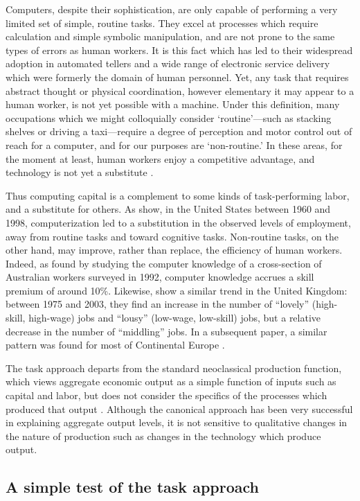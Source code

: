 \documentclass[a4paper,11pt,notitlepage]{article}
\begin{document}
Computers, despite their sophistication, are only capable of performing a very limited set of simple, routine tasks. They excel at processes which require calculation and simple symbolic manipulation, and are not prone to the same types of errors as human workers. It is this fact which has led to their widespread adoption in automated tellers and a wide range of electronic service delivery which were formerly the domain of human personnel. Yet, any task that requires abstract thought or physical coordination, however elementary it may appear to a human worker, is not yet possible with a machine. Under this definition, many occupations which we might colloquially consider `routine'---such as stacking shelves or driving a taxi---require a degree of perception and motor control out of reach for a computer, and for our purposes are `non-routine.' In these areas, for the moment at least, human workers enjoy a competitive advantage, and technology is not yet a substitute \citep{Levy2003}.

Thus computing capital is a complement to some kinds of task-performing labor, and a substitute for others. As \citet{Levy2003} show, in the United States between 1960 and 1998, computerization led to a substitution in the observed levels of employment, away from routine tasks and toward cognitive tasks. Non-routine tasks, on the other hand, may improve, rather than replace, the efficiency of human workers. Indeed, as \citet{Borland2004} found by studying the computer knowledge of a cross-section of Australian workers surveyed in 1992, computer knowledge accrues a skill premium of around 10\%. Likewise, \citet{Goos2007} show a similar trend in the United Kingdom: between 1975 and 2003, they find an increase in the number of ``lovely'' (high-skill, high-wage) jobs and ``lousy'' (low-wage, low-skill) jobs, but a relative decrease in the number of ``middling'' jobs. In a subsequent paper, a similar pattern was found for most of Continental Europe \citep{Goos2009}.

The task approach departs from the standard neoclassical production function, which views aggregate economic output as a simple function of inputs such as capital and labor, but does not consider the specifics of the processes which produced that output \citep{Acemoglu2011}. Although the canonical approach has been very successful in explaining aggregate output levels, it is not sensitive to qualitative changes in the nature of production such as changes in the technology which produce output. 

\subsection{A simple test of the task approach}
\end{document}
